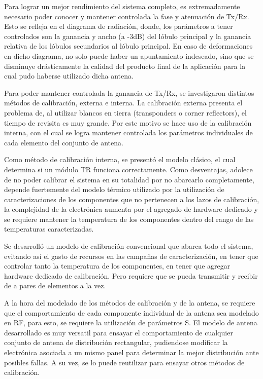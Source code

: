 Para lograr un mejor rendimiento del sistema completo, es extremadamente necesario poder conocer y mantener controlada la fase 
y atenuación de Tx/Rx. Esto se refleja en el diagrama de radiación, donde, los parámetros a tener controlados son la ganancia
y ancho (a -3dB) del lóbulo principal y la ganancia relativa de los lóbulos secundarios al lóbulo principal. En caso de 
deformaciones en dicho diagrama, no solo puede haber un apuntamiento indeseado, sino que se disminuye drásticamente la calidad 
del producto final de la aplicación para la cual pudo haberse utilizado dicha antena.

Para poder mantener controlada la ganancia de Tx/Rx, se investigaron distintos métodos de calibración, externa e interna. La 
calibración externa presenta el problema de, al utilizar blancos en tierra (transponders o corner reflectors), el tiempo de 
revisita es muy grande. Por este motivo se hace uso de la calibración interna, con el cual se logra mantener controlada 
los parámetros individuales de cada elemento del conjunto de antena. 

Como método de calibración interna, se presentó el modelo clásico, el cual determina si un módulo TR funciona correctamente. 
Como desventajas, adolece de no poder calibrar el sistema en su totalidad por no abarcarlo completamente, depende fuertemente del
modelo térmico utilizado por la utilización de caracterizaciones de los componentes que no pertenecen a los lazos de calibración, 
la complejidad de la electrónica aumenta por el agregado de hardware dedicado y se requiere mantener la temperatura de los 
componentes dentro del rango de las temperaturas caracterizadas.

Se desarrolló un modelo de calibración convencional que abarca todo el sistema, evitando así el gasto de recursos en las 
campañas de caracterización, en tener que controlar tanto la temperatura de los componentes, en tener que agregar hardware 
dedicado de calibración. Pero requiere que se pueda transmitir y recibir de a pares de elementos a la vez. 

A la hora del modelado de los métodos de calibración y de la antena, se requiere que el comportamiento de cada componente 
individual de la antena sea modelado en RF, para esto, se requiere la utilización de parámetros S. El modelo de antena 
desarrollado es muy versatil para ensayar el comportamiento de cualquier conjunto de antena de distribución rectangular, 
pudiendose modificar la electrónica asociada a un mismo panel para determinar la mejor distribución ante posibles fallas.
A su vez, se lo puede reutilizar para ensayar otros métodos de calibración.

